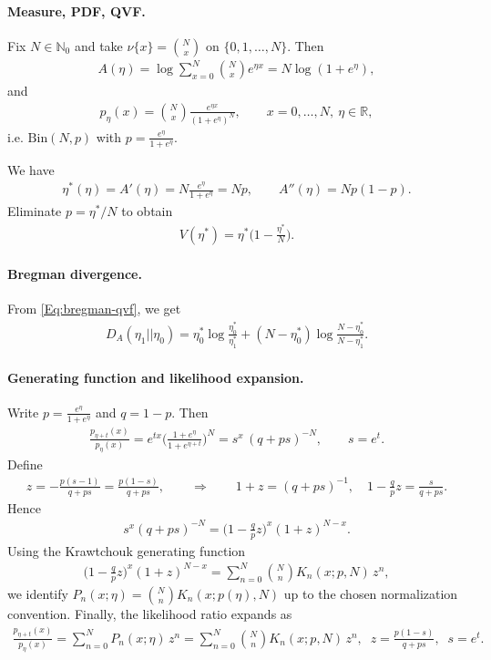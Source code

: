 \documentclass[a4paper,11pt]{article}
\numberwithin{equation}{section}
\theoremstyle{plain}
\theoremstyle{definition}
\theoremstyle{remark}
\newcommand{\R}{\ensuremath{\mathbb{R}}\xspace}
\newcommand{\1}{\ensuremath{\mathds{1}}\xspace}
\begin{document}
\paragraph{Measure, PDF, QVF.} Fix $N\in\mathbb{N}_0$ and take $\nu\{x\}=\binom{N}{x}$ on $\{0,1,\dots,N\}$. Then
\begin{align}
A(\eta)=\log\sum_{x=0}^N \binom{N}{x}e^{\eta x}=N\log(1+e^\eta),
\end{align}
and
\begin{align}
p_\eta(x)=\binom{N}{x}\frac{e^{\eta x}}{(1+e^\eta)^N},\qquad x=0,\dots,N,\ \eta\in\R,
\end{align}
i.e. $\mathrm{Bin}(N,p)$ with $p=\frac{e^\eta}{1+e^\eta}$.

We have
\begin{align}
\eta^\ast(\eta)=A'(\eta)=N\frac{e^\eta}{1+e^\eta}=Np,
\qquad
A''(\eta)=Np(1-p).
\end{align}
Eliminate $p=\eta^\ast/N$ to obtain
\begin{align}
V(\eta^\ast)=\eta^\ast\Big(1-\frac{\eta^\ast}{N}\Big).
\end{align}
\paragraph{Bregman divergence.}
From \eqref{Eq:bregman-qvf}, we get 
\begin{align}
D_A(\eta_1||\eta_0)=\eta_0^\ast\log \frac{\eta_0^\ast}{\eta_1^\ast}+(N-\eta_0^\ast)\log \frac{N-\eta_0^\ast}{N-\eta_1^\ast}.
\end{align}

\paragraph{Generating function and likelihood expansion.} Write $p=\frac{e^\eta}{1+e^\eta}$ and $q=1-p$. Then
\begin{align}
\frac{p_{\eta+t}(x)}{p_\eta(x)}
=e^{t x}\Big(\frac{1+e^\eta}{1+e^{\eta+t}}\Big)^N
=s^x\,(q+ps)^{-N},
\qquad s=e^t.
\end{align}
Define
\begin{align}
z=-\frac{p(s-1)}{q+ps}=\frac{p(1-s)}{q+ps},
\qquad\Longrightarrow\qquad
1+z=(q+ps)^{-1},\quad 1-\frac{q}{p}z=\frac{s}{q+ps}.
\end{align}
Hence
\begin{align}
s^x(q+ps)^{-N}
=\Big(1-\frac{q}{p}z\Big)^x(1+z)^{N-x}.
\end{align}
Using the Krawtchouk generating function
\begin{align}
\Big(1-\frac{q}{p}z\Big)^x(1+z)^{N-x}
=\sum_{n=0}^N \binom{N}{n}K_n(x;p,N)\,z^n,
\end{align}
we identify $P_n(x;\eta)=\binom{N}{n}K_n(x;p(\eta),N)$ up to the chosen normalization convention.
Finally, the likelihood ratio expands as
\begin{align}
\frac{p_{\eta+t}(x)}{p_\eta(x)}
=\sum_{n=0}^N P_n(x;\eta)\,z^n
=\sum_{n=0}^N \binom{N}{n}K_n(x;p,N)\,z^n,
\;\; z=\frac{p(1-s)}{q+ps},\;\;s=e^t.
\end{align}
\end{document}
